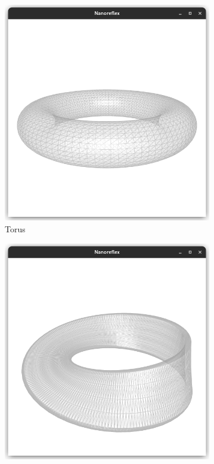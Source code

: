 \documentclass{stdlocal}
\begin{document}

  \begin{figure}
    \centering
    \begin{subfigure}[b]{0.32\linewidth}
      \centering
      \includegraphics[width=\linewidth,trim={25px 50 25 200},clip]{images/polyhedral-surface-torus.png}
      \caption{Torus}
    \end{subfigure}
    \hfill
    \begin{subfigure}[b]{0.32\linewidth}
      \centering
      \includegraphics[width=\linewidth,trim={25px 50 25 200},clip]{images/polyhedral-surface-mobius-thick.png}

\end{subfigure}
\end{figure}
\end{document}
